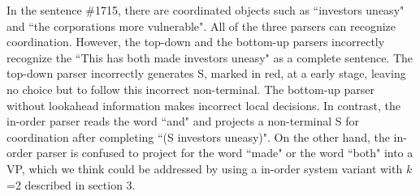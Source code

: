 \documentclass[11pt,letterpaper]{article}
\begin{document}
In the sentence \#1715, there are coordinated objects such as ``investors uneasy" and ``the corporations more vulnerable".
All of the three parsers can recognize coordination.
However, the top-down and the bottom-up parsers incorrectly recognize the ``This has both made investors uneasy" as a complete sentence.
The top-down parser incorrectly generates S, marked in red, at a early stage, leaving no choice but to follow this incorrect non-terminal.
The bottom-up parser without lookahead information makes incorrect local decisions.
In contrast, the in-order parser reads the word ``and" and projects a non-terminal S for coordination after completing ``(S investors uneasy)".
On the other hand, the in-order parser is confused to project for the word ``made" or the word ``both" into a VP, which we think could be addressed by using a in-order system variant with $k$=2 described in section 3.
\end{document}
